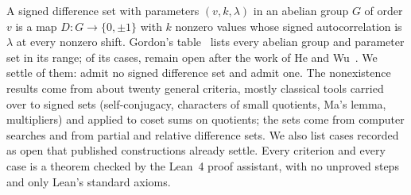 A signed difference set with parameters $(v,k,\lambda)$ in an abelian group $G$ of order $v$ is
a map $D \colon G \to \{0,\pm1\}$ with $k$ nonzero values whose signed autocorrelation is
$\lambda$ at every nonzero shift. Gordon's table~\cite{gordon-db} lists every abelian group and
parameter set in its range; of its \tableRows{} cases, \openAfterHeWu{} remain open after the
work of He and Wu~\cite{he-wu}. We settle \ourRows{} of them: \ourNone{} admit no signed
difference set and \ourExists{} admit one. The nonexistence results come from about twenty
general criteria, mostly classical tools carried over to signed sets (self-conjugacy, characters
of small quotients, Ma's lemma, multipliers) and applied to coset sums on quotients; the sets
come from computer searches and from partial and relative difference sets. We also list
\corrections{} cases recorded as open that published constructions already settle. Every
criterion and every case is a theorem checked by the Lean~4 proof assistant, with no unproved
steps and only Lean's standard axioms.
